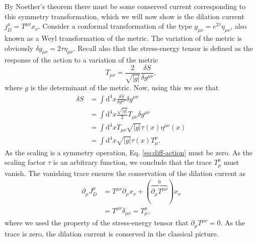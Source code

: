 By Noether's theorem there must be some conserved current corresponding to this symmetry transformation, which we will now show is the dilation current $j_D^{\mu } = T^{\mu \nu } x_{\nu }$.
Consider a conformal transformation of the type $g_{\mu \nu } = e^{2\tau } \eta _{\mu \nu }$, also known as a Weyl transformation of the metric.
The variation of the metric is obviously $\delta g_{\mu \nu } = 2 \tau \eta _{\mu \nu }$.
Recall also that the stress-energy tensor is defined as the response of the action to a variation of the metric
\begin{equation}
  T_{\mu \nu } = \frac{2}{\sqrt{|g|}} \frac{{\delta S}}{\delta  g^{\mu \nu }},
\end{equation}
where $g$ is the determinant of the metric.
Now, using this we see that
\begin{equation}
  \label{eq:diff-action}
  \begin{split}
    \delta  S &= \int \mathrm{d}^4x \frac{\delta S}{\delta g^{\mu \nu }} \delta g^{\mu \nu }\\
    &= \int \mathrm{d}^4x \frac{\sqrt{|g|}}{2 } T_{\mu \nu } \delta g^{\mu \nu }\\
    &= \int \mathrm{d}^4x T_{\mu \nu } \sqrt{|g|} \tau (x) \eta ^{\mu \nu }(x)\\
    &= \int \mathrm{d}^4x \sqrt{|g|} \tau (x) T^{\mu }_{\mu }.
  \end{split}
\end{equation}
As the scaling is a symmetry operation, Eq. \ref{eq:diff-action} must be zero.
As the scaling factor $\tau $ is an arbitrary function, we conclude that the trace $T^{\mu }_{\mu }$ must vanish.
The vanishing trace ensures the conservation of the dilation current as
\begin{align}
  \label{eq:dilation-diff}
  \partial _{\mu } J_D^{\mu } &= T^{\mu \nu }\partial_{\mu } x_\nu +
                                (\overbrace{ \partial _{\mu }T^{\mu \nu } }^{0}) x_{\nu }\\
  \nonumber &= T^{\mu \nu }\delta _{\mu \nu } = T^{\mu }_{\mu },
\end{align}
where we used the property of the stress-energy tensor that $\partial _{\mu }T^{\mu \nu } = 0$.
As the trace is zero, the dilation current is conserved in the classical picture.


